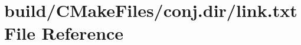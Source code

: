 \hypertarget{conj_8dir_2link_8txt}{}\section{build/\+C\+Make\+Files/conj.dir/link.txt File Reference}
\label{conj_8dir_2link_8txt}
